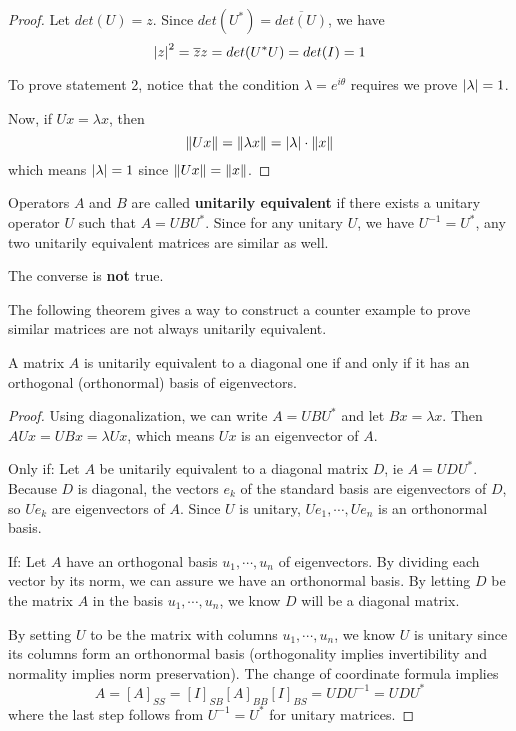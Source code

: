 \begin{proof}
Let $det(U) = z$. Since $det(U^{*}) = \overline{det(U)}$, we have 
$$\abs{z}^{2} = \overline{z}z = det(U^{*} U) = det(I) = 1$$

To prove statement 2, notice that the condition $\lambda = e^{i \theta}$ requires we prove $\abs{\lambda} = 1$. 

Now, if $Ux = \lambda x$, then 
$$\norm{Ux} = \norm{\lambda x} = \abs{\lambda} \cdot \norm{x}$$
which means $\abs{\lambda} = 1$ since $\norm{Ux} = \norm{x}$. 
\end{proof}

\begin{definition}
Operators $A$ and $B$ are called \textbf{unitarily equivalent} if there exists a unitary operator $U$ such that $A = UBU^{*}$. Since for any unitary $U$, we have $U^{-1} = U^{*}$, any two unitarily equivalent matrices are similar as well. 

The converse is \textbf{not} true. 
\end{definition}

The following theorem gives a way to construct a counter example to prove similar matrices are not always unitarily equivalent. 

\begin{theorem}
A matrix $A$ is unitarily equivalent to a diagonal one if and only if it has an orthogonal (orthonormal) basis of eigenvectors. 
\end{theorem}

\begin{proof}
Using diagonalization, we can write $A = UBU^{*}$ and let $Bx = \lambda x$. Then $AUx = UBx = \lambda Ux$, which means $Ux$ is an eigenvector of $A$. 

Only if: Let $A$ be unitarily equivalent to a diagonal matrix $D$, ie $A = UDU^{*}$. Because $D$ is diagonal, the vectors $e_{k}$ of the standard basis are eigenvectors of $D$, so $Ue_{k}$ are eigenvectors of $A$. Since $U$ is unitary, $Ue_{1}, \cdots, Ue_{n}$ is an orthonormal basis. 

If: Let $A$ have an orthogonal basis $u_{1}, \cdots, u_{n}$ of eigenvectors. By dividing each vector by its norm, we can assure we have an orthonormal basis. By letting $D$ be the matrix $A$ in the basis $u_{1}, \cdots, u_{n}$, we know $D$ will be a diagonal matrix. 

By setting $U$ to be the matrix with columns $u_{1}, \cdots, u_{n}$, we know $U$ is unitary since its columns form an orthonormal basis (orthogonality implies invertibility and normality implies norm preservation). The change of coordinate formula implies 
$$A = [A]_{SS} = [I]_{SB} [A]_{BB} [I]_{BS} = UDU^{-1} = UDU^{*}$$
where the last step follows from $U^{-1} = U^{*}$ for unitary matrices. 
\end{proof}

